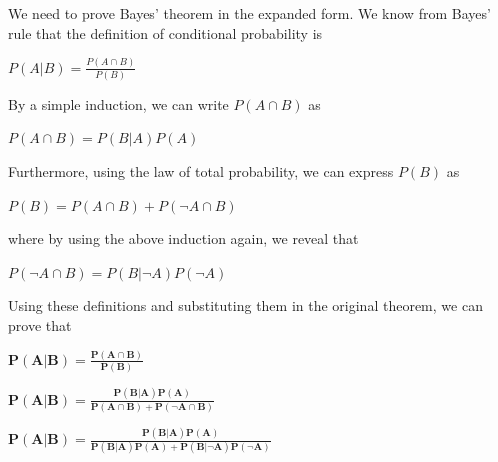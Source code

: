\documentclass[12pt,letterpaper, onecolumn]{exam}
\begin{document}
\begin{questions}
\begin{parts}


        \begin{solution}

            We need to prove Bayes' theorem in the expanded form. We know from Bayes' rule that the definition of conditional probability is
            
            \begin{center}
                $\displaystyle{P(A|B) = \frac{P(A \cap B)}{P(B)}}$
            \end{center}

            By a simple induction, we can write $\displaystyle{P(A \cap B)}$ as

            \begin{center}
                $\displaystyle{P(A \cap B)= P(B|A)P(A)}$
            \end{center}

            Furthermore, using the law of total probability, we can express $\displaystyle{P(B)}$ as

            \begin{center}
                $\displaystyle{P(B) = P(A \cap B) + P(\lnot A \cap B)}$
            \end{center}

            where by using the above induction again, we reveal that

            \begin{center}
                $\displaystyle{P(\lnot A \cap B)= P(B|\lnot A)P(\lnot A)}$
            \end{center}

            Using these definitions and substituting them in the original theorem, we can prove that 

            \begin{center}
                $\boldsymbol{\displaystyle{P(A|B) = \frac{P(A \cap B)}{P(B)}}}$

                $\boldsymbol{\displaystyle{P(A|B) = \frac{P(B|A)P(A)}{P(A \cap B) + P(\lnot A \cap B)}}}$

                $\boldsymbol{\displaystyle{P(A|B) = \frac{P(B|A)P(A)}{P(B|A)P(A) + P(B|\lnot A)P(\lnot A)}}}$
            \end{center}


\end{solution}
\end{parts}
\end{questions}
\end{document}
